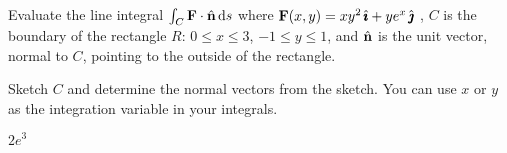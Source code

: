 \subsection*{\Application}
\begin{question}[M317 2016D] %
Evaluate the line integral $\int_C \mathbf{F}\cdot\hat{\mathbf{n}}\,\mathrm{d}s$ where
$\mathbf{F}(x,y) = xy^2 \,\hat{\pmb{\imath}} + ye^x \,\hat{\pmb{\jmath}}$ , $C$ is the boundary of the
rectangle $R$: $0 \le x \le 3$, $-1 \le y \le 1$, and  $\hat{\mathbf{n}}$ is the unit vector, normal to $C$, pointing to the outside of the rectangle.
\end{question}

\begin{hint} 
Sketch $C$ and determine the normal vectors from the sketch. You can use $x$ or $y$ as the integration variable in your 
           integrals.
\end{hint}

\begin{answer} 
$2e^3$
\end{answer}

